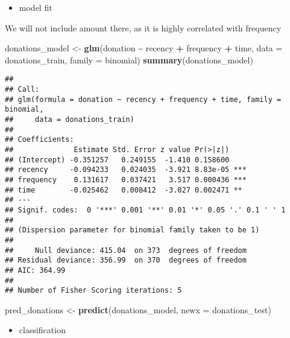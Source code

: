 \documentclass[
]{article}
\newenvironment{Shaded}{\begin{snugshade}}{\end{snugshade}}
\newcommand{\AttributeTok}[1]{\textcolor[rgb]{0.13,0.29,0.53}{#1}}
\newcommand{\FunctionTok}[1]{\textcolor[rgb]{0.13,0.29,0.53}{\textbf{#1}}}
\newcommand{\NormalTok}[1]{#1}
\newcommand{\OtherTok}[1]{\textcolor[rgb]{0.56,0.35,0.01}{#1}}
\newcommand{\SpecialCharTok}[1]{\textcolor[rgb]{0.81,0.36,0.00}{\textbf{#1}}}
\providecommand{\tightlist}{%
  \setlength{\itemsep}{0pt}\setlength{\parskip}{0pt}}
\begin{document}
\begin{itemize}
\tightlist
\item
  model fit
\end{itemize}

We will not include amount there, as it is highly correlated with
frequency

\begin{Shaded}
\begin{Highlighting}[]
\NormalTok{donations\_model }\OtherTok{\textless{}{-}} \FunctionTok{glm}\NormalTok{(donation }\SpecialCharTok{\textasciitilde{}}\NormalTok{ recency }\SpecialCharTok{+}\NormalTok{ frequency }\SpecialCharTok{+}\NormalTok{ time,}
  \AttributeTok{data =}\NormalTok{ donations\_train,}
  \AttributeTok{family =}\NormalTok{ binomial)}
\FunctionTok{summary}\NormalTok{(donations\_model)}
\end{Highlighting}
\end{Shaded}

\begin{verbatim}
## 
## Call:
## glm(formula = donation ~ recency + frequency + time, family = binomial, 
##     data = donations_train)
## 
## Coefficients:
##              Estimate Std. Error z value Pr(>|z|)    
## (Intercept) -0.351257   0.249155  -1.410 0.158600    
## recency     -0.094233   0.024035  -3.921 8.83e-05 ***
## frequency    0.131617   0.037421   3.517 0.000436 ***
## time        -0.025462   0.008412  -3.027 0.002471 ** 
## ---
## Signif. codes:  0 '***' 0.001 '**' 0.01 '*' 0.05 '.' 0.1 ' ' 1
## 
## (Dispersion parameter for binomial family taken to be 1)
## 
##     Null deviance: 415.04  on 373  degrees of freedom
## Residual deviance: 356.99  on 370  degrees of freedom
## AIC: 364.99
## 
## Number of Fisher Scoring iterations: 5
\end{verbatim}

\begin{Shaded}
\begin{Highlighting}[]
\NormalTok{pred\_donations }\OtherTok{\textless{}{-}} \FunctionTok{predict}\NormalTok{(donations\_model, }\AttributeTok{newx =}\NormalTok{ donations\_test)}
\end{Highlighting}
\end{Shaded}

\begin{itemize}
\tightlist
\item
  classification
\end{itemize}
\end{document}
